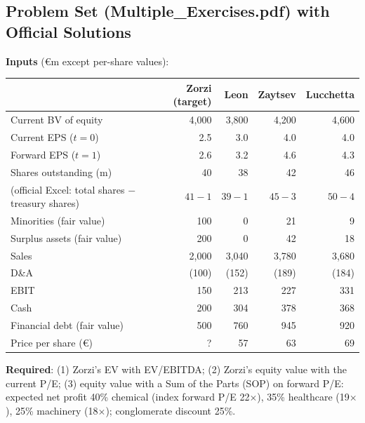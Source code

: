 \subsection{Problem Set (Multiple\_Exercises.pdf) with Official Solutions}

\begin{exbox}
\textbf{Inputs} (\euro m except per-share values):
\begin{center}
\footnotesize
\begin{tabular}{@{}lrrrr@{}}
\toprule
 & \textbf{Zorzi (target)} & Leon & Zaytsev & Lucchetta\\
\midrule
Current BV of equity & 4,000 & 3,800 & 4,200 & 4,600\\
Current EPS ($t=0$) & 2.5 & 3.0 & 4.0 & 4.0\\
Forward EPS ($t=1$) & 2.6 & 3.2 & 4.6 & 4.3\\
Shares outstanding (m) & 40 & 38 & 42 & 46\\
\quad\footnotesize(official Excel: total shares $-$ treasury shares) & \footnotesize$41-1$ & \footnotesize$39-1$ & \footnotesize$45-3$ & \footnotesize$50-4$\\
Minorities (fair value) & 100 & 0 & 21 & 9\\
Surplus assets (fair value) & 200 & 0 & 42 & 18\\
Sales & 2,000 & 3,040 & 3,780 & 3,680\\
D\&A & (100) & (152) & (189) & (184)\\
EBIT & 150 & 213 & 227 & 331\\
Cash & 200 & 304 & 378 & 368\\
Financial debt (fair value) & 500 & 760 & 945 & 920\\
Price per share (\euro) & ? & 57 & 63 & 69\\
\bottomrule
\end{tabular}
\end{center}
\textbf{Required}: (1) Zorzi's EV with EV/EBITDA; (2) Zorzi's equity value with the current P/E; (3) equity value with a Sum of the Parts (SOP) on forward P/E: expected net profit 40\% chemical (index forward P/E 22$\times$), 35\% healthcare (19$\times$), 25\% machinery (18$\times$); conglomerate discount 25\%.


\end{exbox}

